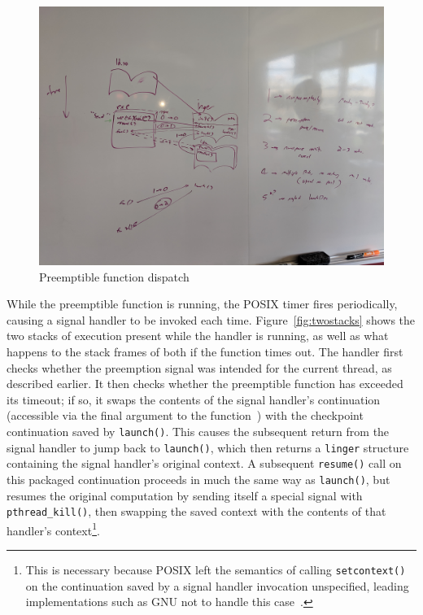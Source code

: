 \begin{figure}
\includegraphics[width=\columnwidth]{figs/calltree}
\caption{Preemptible function dispatch}
\label{fig:callsimple}
\end{figure}

While the preemptible function is running, the POSIX timer fires periodically,
causing a signal handler to be invoked each time.  Figure~\ref{fig:twostacks} shows
the two stacks of execution present while the handler is running, as well as what
happens to the stack frames of both if the function times out.  The handler first
checks whether the preemption signal was intended for the current thread, as
described earlier.  It then checks whether the preemptible function has exceeded its
timeout; if so, it swaps the contents of the signal handler's continuation
(accessible via the final argument to the function~\cite{sigaction-manpage}) with the
checkpoint continuation saved by \texttt{launch()}.  This causes the subsequent
return from the signal handler to jump back to \texttt{launch()}, which then returns
a \texttt{linger} structure containing the signal handler's original context.  A
subsequent \texttt{resume()} call on this packaged continuation proceeds in much the
same way as \texttt{launch()}, but resumes the original computation by sending itself
a special signal with \texttt{pthread\_kill()}, then swapping the saved context with
the contents of that handler's context\footnote{This is necessary because POSIX left
the semantics of calling \texttt{setcontext()} on the continuation saved by a signal
handler invocation unspecified, leading implementations such as GNU not to handle
this case~\cite{getcontext-manpage}.}.

